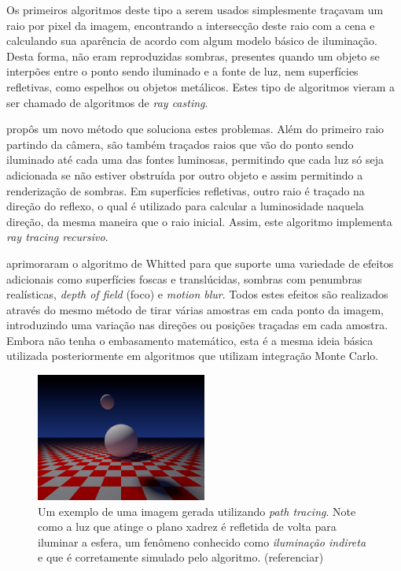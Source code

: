 \documentclass[12pt]{article}
\newcommand{\todo}[1]{\textsf{\color{red}#1}}
\begin{document}
Os primeiros algoritmos deste tipo a serem usados simplesmente traçavam um raio por pixel da imagem,
encontrando a intersecção deste raio com a cena e calculando sua aparência de acordo com algum
modelo básico de iluminação. Desta forma, não eram reproduzidas sombras, presentes quando um objeto
se interpões entre o ponto sendo iluminado e a fonte de luz, nem superfícies refletivas, como
espelhos ou objetos metálicos. Estes tipo de algoritmos vieram a ser chamado de algoritmos de
\emph{ray casting}.

 propôs um novo método que soluciona estes problemas. Além do primeiro raio
partindo da câmera, são também traçados raios que vão do ponto sendo iluminado até cada uma das
fontes luminosas, permitindo que cada luz só seja adicionada se não estiver obstruída por outro
objeto e assim permitindo a renderização de sombras. Em superfícies refletivas, outro raio é traçado
na direção do reflexo, o qual é utilizado para calcular a luminosidade naquela direção, da mesma
maneira que o raio inicial. Assim, este algoritmo implementa \emph{ray tracing recursivo}.

 aprimoraram o algoritmo de Whitted para que suporte uma variedade de efeitos
adicionais como superfícies foscas e translúcidas, sombras com penumbras realísticas, \emph{depth of
field} (foco) e \emph{motion blur}. Todos estes efeitos são realizados através do mesmo método de
tirar várias amostras em cada ponto da imagem, introduzindo uma variação nas direções ou posições
traçadas em cada amostra. Embora não tenha o embasamento matemático, esta é a mesma ideia básica
utilizada posteriormente em algoritmos que utilizam integração Monte Carlo.

\begin{figure}
	\centering
	\includegraphics[width=0.5\textwidth]{exemplo_imagem}
	\caption{
		Um exemplo de uma imagem gerada utilizando \emph{path tracing}. Note como a luz que atinge o
		plano xadrez é refletida de volta para iluminar a esfera, um fenômeno conhecido como
		\emph{iluminação indireta} e que é corretamente simulado pelo algoritmo.
		\todo{(referenciar)}
	}
\end{figure}
\end{document}
